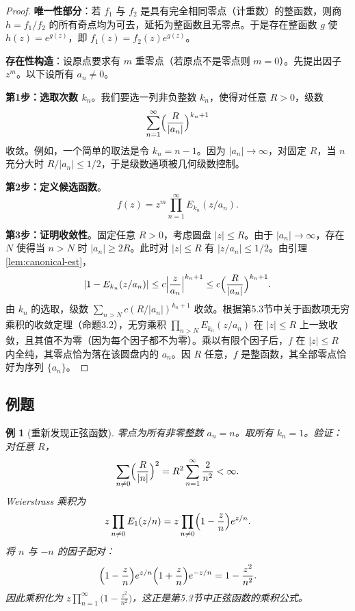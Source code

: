 \documentclass[UTF8]{ctexart}
\newtheorem{example}{例}[section]
\numberwithin{equation}{section}
\begin{document}
\begin{proof}
\textbf{唯一性部分}：若 \(f_1\) 与 \(f_2\) 是具有完全相同零点（计重数）的整函数，则商 \(h = f_1/f_2\) 的所有奇点均为可去，延拓为整函数且无零点。于是存在整函数 \(g\) 使 \(h(z) = e^{g(z)}\)，即 \(f_1(z) = f_2(z) e^{g(z)}\)。

\textbf{存在性构造}：设原点要求有 \(m\) 重零点（若原点不是零点则 \(m = 0\)）。先提出因子 \(z^m\)。以下设所有 \(a_n \neq 0\)。

\textbf{第1步：选取次数 \(k_n\)}。我们要选一列非负整数 \(k_n\)，使得对任意 \(R > 0\)，级数
\[
\sum_{n=1}^\infty \Bigl( \frac{R}{|a_n|} \Bigr)^{k_n+1}
\]
收敛。例如，一个简单的取法是令 \(k_n = n-1\)。因为 \(|a_n| \to \infty\)，对固定 \(R\)，当 \(n\) 充分大时 \(R/|a_n| \le 1/2\)，于是级数通项被几何级数控制。

\textbf{第2步：定义候选函数}。
\[
f(z) = z^m \prod_{n=1}^\infty E_{k_n}(z/a_n).
\]

\textbf{第3步：证明收敛性}。固定任意 \(R > 0\)，考虑圆盘 \(|z| \le R\)。由于 \(|a_n| \to \infty\)，存在 \(N\) 使得当 \(n > N\) 时 \(|a_n| \ge 2R\)。此时对 \(|z| \le R\) 有 \(|z/a_n| \le 1/2\)。由引理 \ref{lem:canonical-est}，
\[
|1 - E_{k_n}(z/a_n)| \le c \Bigl| \frac{z}{a_n} \Bigr|^{k_n+1} \le c \Bigl( \frac{R}{|a_n|} \Bigr)^{k_n+1}.
\]
由 \(k_n\) 的选取，级数 \(\sum_{n > N} c (R/|a_n|)^{k_n+1}\) 收敛。根据第5.3节中关于函数项无穷乘积的收敛定理（命题3.2），无穷乘积 \(\prod_{n > N} E_{k_n}(z/a_n)\) 在 \(|z| \le R\) 上一致收敛，且其值不为零（因为每个因子都不为零）。乘以有限个因子后，\(f\) 在 \(|z| \le R\) 内全纯，其零点恰为落在该圆盘内的 \(a_n\)。因 \(R\) 任意，\(f\) 是整函数，其全部零点恰好为序列 \(\{a_n\}\)。
\end{proof}

\subsection{例题}

\begin{example}[重新发现正弦函数]
零点为所有非零整数 \(a_n = n\)。取所有 \(k_n = 1\)。验证：对任意 \(R\)，
\[
\sum_{n \neq 0} \Bigl( \frac{R}{|n|} \Bigr)^{2} = R^2 \sum_{n=1}^\infty \frac{2}{n^2} < \infty.
\]
Weierstrass 乘积为
\[
z \prod_{n \neq 0} E_1(z/n) = z \prod_{n \neq 0} \Bigl( 1 - \frac{z}{n} \Bigr) e^{z/n}.
\]
将 \(n\) 与 \(-n\) 的因子配对：
\[
\Bigl( 1 - \frac{z}{n} \Bigr) e^{z/n} \Bigl( 1 + \frac{z}{n} \Bigr) e^{-z/n} = 1 - \frac{z^2}{n^2}.
\]
因此乘积化为 \(z \prod_{n=1}^\infty \bigl( 1 - \frac{z^2}{n^2} \bigr)\)，这正是第5.3节中正弦函数的乘积公式。
\end{example}
\end{document}
